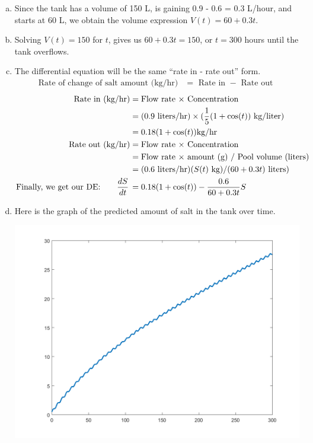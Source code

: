 \begin{enumerate}[1.]
\begin{Solution}
\begin{enumerate}[(a)]
  \item Since the tank has a volume of 150 L, is gaining 0.9 - 0.6 = 0.3
  L/hour, and starts at 60 L, we obtain the volume expression $V(t) = 60 + 0.3 t$.

\item Solving $V(t) = 150$ for $t$, gives us $ 60 + 0.3 t = 150$, or
  $t = 300$ hours until the tank overflows.

\item The differential equation will be the same ``rate in - rate
  out'' form.
\begin{align*}
  \text{Rate of change of salt amount (kg/hr)} & = \text{ Rate in } - \text{ Rate out } 
\end{align*}
\begin{align*}
  \text{Rate in (kg/hr)} & = \text{Flow rate $\times$ Concentration} \\
                         & = (0.9 \text{ liters/hr}) \times (\frac{1}{5} (1 + \cos(t)) \text{ kg/liter}) \\
                         & = 0.18(1 + \cos(t)) \text{kg/hr} \\
  \text{Rate out (kg/hr)} & = \text{Flow rate $\times$ Concentration}  \\
                         & =\text{Flow rate $\times$ amount (g) / Pool volume (liters)} \\
                         & = (0.6 \text{ liters/hr}) (S(t) \text{ kg}) / (60 + 0.3 t) \text{ liters}) \\
  \text{Finally, we get our DE: } ~~~~~ \frac{d {S}}{dt} \, &= 0.18 (1 + \cos(t)) - \frac{0.6}{60 + 0.3t} S
\end{align*}

\item Here is the graph of the predicted amount of salt in the tank over time. 

  \includegraphics[width=0.75\linewidth]{graphics/Week09_SingleTanks/single_tank_2a}


\end{enumerate}
\end{Solution}
\end{enumerate}
